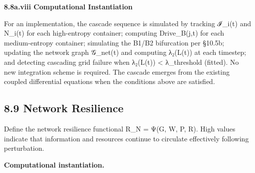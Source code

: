 \documentclass[
]{article}
\begin{document}
\textbf{8.8a.viii Computational Instantiation}

For an implementation, the cascade sequence is simulated by tracking
ℐ\_i(t) and N\_i(t) for each high-entropy container; computing
Drive\_B(j,t) for each medium-entropy container; simulating the B1/B2
bifurcation per §10.5b; updating the network graph 𝒢\_net(t) and
computing λ₂(L(t)) at each timestep; and detecting cascading grid
failure when λ₂(L(t)) \textless{} λ\_threshold (fitted). No new
integration scheme is required. The cascade emerges from the existing
coupled differential equations when the conditions above are satisfied.

\hypertarget{network-resilience}{%
\subsection{8.9 Network Resilience}\label{network-resilience}}

Define the network resilience functional R\_N = Ψ(G, W, P, R). High
values indicate that information and resources continue to circulate
effectively following perturbation.

\textbf{Computational instantiation.}
\end{document}
